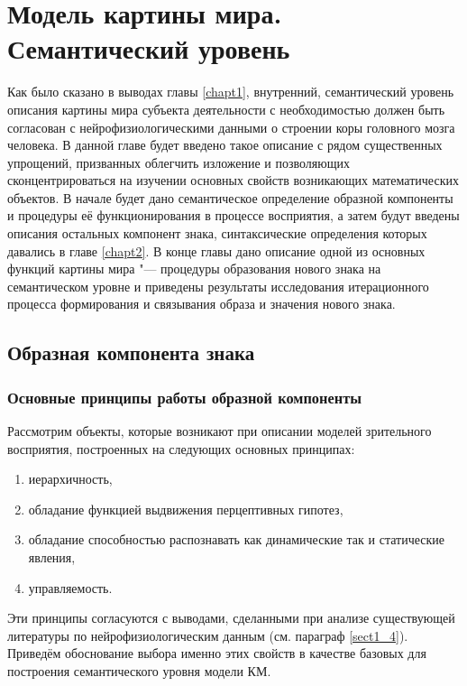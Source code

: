 \chapter{Модель картины мира. Семантический уровень} \label{chapt3}

Как было сказано в выводах главы \ref{chapt1}, внутренний, семантический уровень описания картины мира субъекта деятельности с необходимостью должен быть согласован с нейрофизиологическими данными о строении коры головного мозга человека. В данной главе будет введено такое описание с рядом существенных упрощений, призванных облегчить изложение и позволяющих сконцентрироваться на изучении основных свойств возникающих математических объектов. В начале будет дано семантическое определение образной компоненты и процедуры её функционирования в процессе восприятия, а затем будут введены описания остальных компонент знака, синтаксические определения которых давались в главе \ref{chapt2}. В конце главы дано описание одной из основных функций картины мира "--- процедуры образования нового знака на семантическом уровне и приведены результаты исследования итерационного процесса формирования и связывания образа и значения нового знака.

\section{Образная компонента знака}\label{sect3_1}

\subsection{Основные принципы работы образной компоненты} \label{subsect3_1_1}

Рассмотрим объекты, которые возникают при описании моделей зрительного восприятия, построенных на следующих основных принципах:
\begin{enumerate}
	\item иерархичность,
	\item обладание функцией выдвижения перцептивных гипотез,
	\item обладание способностью распознавать как динамические так и статические явления,
	\item управляемость.
\end{enumerate}

Эти принципы согласуются с выводами, сделанными при анализе существующей литературы по нейрофизиологическим данным (см. параграф \ref{sect1_4}). Приведём обоснование выбора именно этих свойств в качестве базовых для построения семантического уровня модели КМ.

